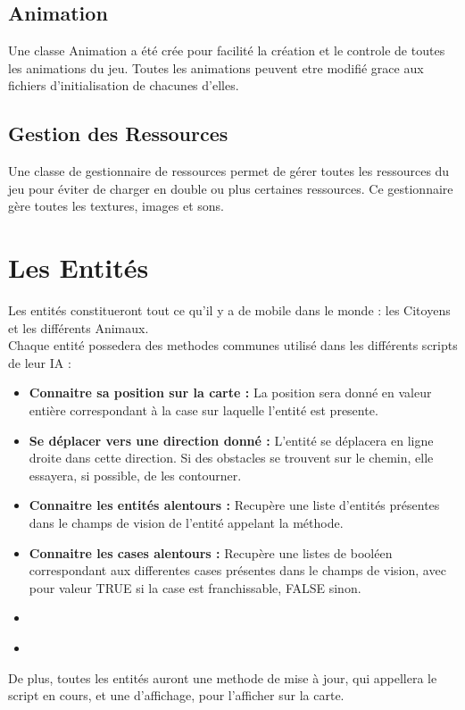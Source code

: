 \documentclass[a4paper]{article}
\begin{document}
		\subsection{Animation}
			Une classe Animation a été crée pour facilité la création et le controle de toutes les animations du jeu. Toutes les animations peuvent etre modifié grace aux fichiers d'initialisation de chacunes d'elles.
		\subsection{Gestion des Ressources}
			Une classe de gestionnaire de ressources permet de gérer toutes les ressources du jeu pour éviter de charger en double ou plus certaines ressources. Ce gestionnaire gère toutes les textures, images et sons.
			
			
    \section{Les Entités}
		Les entités constitueront tout ce qu'il y a de mobile dans le monde : les Citoyens et les différents Animaux.\\
		Chaque entité possedera des methodes communes utilisé dans les différents scripts de leur IA :
		\begin{itemize}
            \item \textbf{Connaitre sa position sur la carte : } La position sera donné en valeur entière correspondant à la case sur laquelle l'entité est presente.
            \item \textbf{Se déplacer vers une direction donné : } L'entité se déplacera en ligne droite dans cette direction. Si des obstacles se trouvent sur le chemin, elle essayera, si possible, de les contourner.
            \item \textbf{Connaitre les entités alentours : } Recupère une liste d'entités présentes dans le champs de vision de l'entité appelant la méthode.
            \item \textbf{Connaitre les cases alentours : } Recupère une listes de booléen correspondant aux differentes cases présentes dans le champs de vision, avec pour valeur TRUE si la case est franchissable, FALSE sinon.
            \item \textbf{}
            \item \textbf{}
        \end{itemize}
		De plus, toutes les entités auront une methode de mise à jour, qui appellera le script en cours, et une d'affichage, pour l'afficher sur la carte.
		
\end{document}
